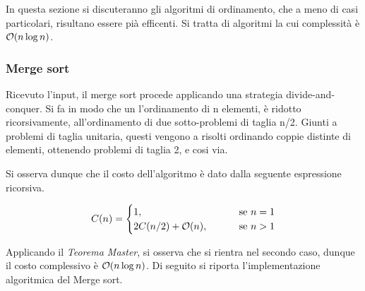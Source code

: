 \documentclass{subfiles}
\begin{document}
In questa sezione si discuteranno gli algoritmi di ordinamento, che a meno di casi particolari, risultano essere pià efficenti.
Si tratta di algoritmi la cui complessità è \(\order{n \log n}\).

\subsubsection{Merge sort}
Ricevuto l'input, il merge sort procede applicando una strategia divide-and-conquer.
Si fa in modo che un l'ordinamento di n elementi, è ridotto ricorsivamente, all'ordinamento di due sotto-problemi di taglia n/2.
Giunti a problemi di taglia unitaria, questi vengono a risolti ordinando coppie distinte di elementi, ottenendo problemi di taglia 2, e cosi via.

Si osserva dunque che il costo dell'algoritmo è dato dalla seguente espressione ricorsiva.

\[
    C(n) = \begin{cases}
        1, \qquad                    & \text{se} n = 1 \\
        2 C(n/2) + \order{n}, \qquad & \text{se} n > 1
    \end{cases}\]

\noindent Applicando il \emph{Teorema Master}, si osserva che si rientra nel secondo caso, dunque il costo complessivo è \(\order{n \log n}\).
Di seguito si riporta l'implementazione algoritmica del Merge sort.


\end{document}
